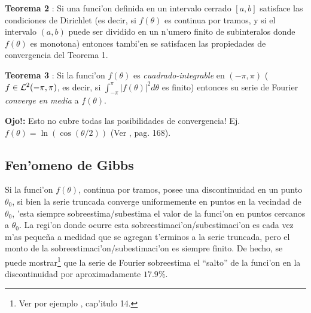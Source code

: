 \textbf{Teorema 2} \cite{Butkov}: Si una funci'on definida en un intervalo cerrado $[a,b]$ satisface las condiciones de Dirichlet (es decir, si $f(\theta)$ es continua por tramos, y si el intervalo $(a,b)$ puede ser dividido en un n'umero finito de subinteralos donde $f(\theta)$ es monotona) entonces tambi'en se satisfacen las propiedades de convergencia del Teorema 1.

\textbf{Teorema 3} \cite{Butkov}: Si la funci'on $f(\theta)$ es \textit{cuadrado-integrable} en $(-\pi,\pi)$ ($f\in {\cal L}^2(-\pi,\pi)$, es decir, si $\int_{-\pi}^\pi|f(\theta)|^2d\theta$ es finito) entonces su serie de Fourier \textit{converge en media} a $f(\theta)$.

\textbf{Ojo!:} Esto no cubre todas las posibilidades de convergencia! Ej. $f(\theta)=\ln(\cos(\theta/2))$ (Ver \cite{Butkov}, pag.  168).

\subsection{Fen'omeno de Gibbs}

Si la funci'on $f(\theta)$, continua por tramos, posee una discontinuidad en un punto $\theta_0$, si bien la serie truncada converge uniformemente en puntos en la vecindad de $\theta_0$, 'esta siempre sobreestima/subestima el valor de la funci'on en puntos cercanos a $\theta_0$. La regi'on donde ocurre esta sobreestimaci'on/subestimaci'on es cada vez m'as peque\~na a medidad que se agregan t'erminos a la serie truncada, pero el monto de la sobreestimaci'on/subestimaci'on es siempre finito. De hecho, se puede mostrar\footnote{Ver por ejemplo \cite{Arfken}, cap'itulo 14.} que la serie de Fourier sobreestima el ``salto'' de la funci'on en la discontinuidad por aproximadamente $17.9\%$.

